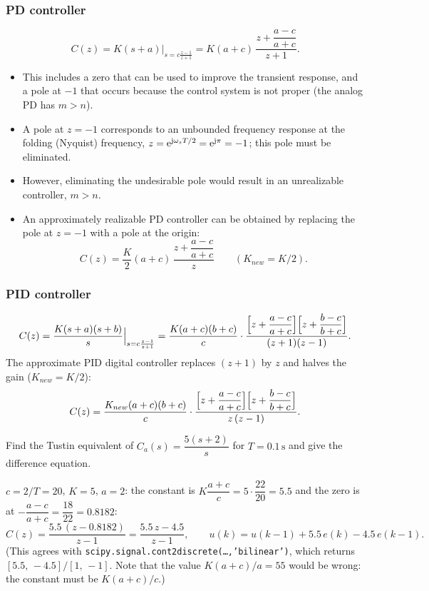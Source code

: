 \subsubsection*{PD controller}
\begin{equation}
  C(z)=K(s+a)\Big|_{s=c\frac{z-1}{z+1}}=K(a+c)\,\frac{z+\dfrac{a-c}{a+c}}{z+1}.
\end{equation}
\begin{itemize}
  \item This includes a zero that can be used to improve the transient response, and a pole at $-1$ that occurs because
        the control system is not proper (the analog PD has $m>n$).
  \item A pole at $z=-1$ corresponds to an unbounded frequency response at the folding (Nyquist) frequency,
        $z=\mathrm{e}^{\mathrm{j}\omega_s T/2}=\mathrm{e}^{\mathrm{j}\pi}=-1$; this pole must be eliminated.
  \item However, eliminating the undesirable pole would result in an unrealizable controller, $m>n$.
  \item An approximately realizable PD controller can be obtained by replacing the pole at $z=-1$ with a pole at the origin:
  \[
    C(z)=\frac{K}{2}(a+c)\,\frac{z+\dfrac{a-c}{a+c}}{z}\qquad(K_{new}=K/2).
  \]
\end{itemize}

\subsubsection*{PID controller}
\[
  C(z)=\frac{K(s+a)(s+b)}{s}\Big|_{s=c\frac{z-1}{z+1}}
  =\frac{K(a+c)(b+c)}{c}\cdot\frac{\Bigl[z+\dfrac{a-c}{a+c}\Bigr]\Bigl[z+\dfrac{b-c}{b+c}\Bigr]}{(z+1)(z-1)}.
\]
The approximate PID digital controller replaces $(z+1)$ by $z$ and halves the gain ($K_{new}=K/2$):
\[
  C(z)=\frac{K_{new}(a+c)(b+c)}{c}\cdot\frac{\Bigl[z+\dfrac{a-c}{a+c}\Bigr]\Bigl[z+\dfrac{b-c}{b+c}\Bigr]}{z\,(z-1)}.
\]

\begin{problem}[PI]
Find the Tustin equivalent of $C_a(s)=\dfrac{5(s+2)}{s}$ for $T=0.1\,\mathrm{s}$ and give the difference equation.
\end{problem}
\begin{solution}
$c=2/T=20$, $K=5$, $a=2$: the constant is $K\dfrac{a+c}{c}=5\cdot\dfrac{22}{20}=5.5$ and the zero is at
$-\dfrac{a-c}{a+c}=\dfrac{18}{22}=0.8182$:
\[
  C(z)=\frac{5.5\,(z-0.8182)}{z-1}=\frac{5.5\,z-4.5}{z-1},\qquad u(k)=u(k-1)+5.5\,e(k)-4.5\,e(k-1).
\]
(This agrees with \texttt{scipy.signal.cont2discrete(\dots,'bilinear')}, which returns $[5.5,\,-4.5]/[1,\,-1]$. Note
that the value $K(a+c)/a=55$ would be wrong: the constant must be $K(a+c)/c$.)
\end{solution}

